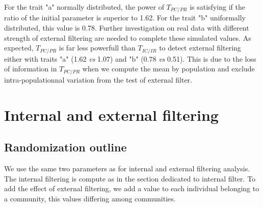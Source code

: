 \documentclass[12pt]{article}\usepackage[]{graphicx}\usepackage[]{color}
\begin{document}
For the trait "a" normally distributed, the power of $T_{PC/PR}$ is satisfying if the ratio of the initial parameter is superior to
 1.62. For the trait "b" uniformally distributed, this value is 0.78. 
 Further investigation on real data with different strength of external filtering are needed to complete these simulated values. As expected, $T_{PC/PR}$ is far less powerfull than $T_{IC/IR}$ to detect external filtering either with traits "a" (1.62 \textit{vs} 1.07) and "b" (0.78 \textit{vs} 0.51). This is due to the loss of information in $T_{PC/PR}$ when we compute the mean by population and exclude intra-populationnal variation from the test of external filter. 




































\cleardoublepage

\section{Internal and external filtering}

  \subsection{Randomization outline}
We use the same two parameters as for internal and external filtering analysis. The internal filtering is compute as in the section dedicated to internal filter. To add the effect of external filtering, we add a value to each individual belonging to a community, this values differing among communities.
\end{document}
